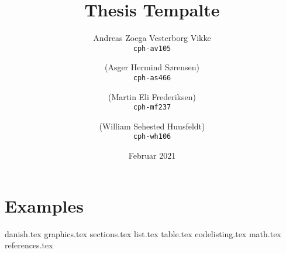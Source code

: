 \documentclass[a4paper,12pt]{report}
\title{Thesis Tempalte}
\author{
    Andreas Zoega Vesterborg Vikke\\
    \texttt{cph-av105}
    \and
    (Asger Hermind Sørensen)\\
    \texttt{cph-as466}
    \and
    (Martin Eli Frederiksen)\\
    \texttt{cph-mf237}
    \and
    (William Sehested Huusfeldt)\\
    \texttt{cph-wh106}
}
\date{Februar 2021}
\begin{document}
\listoftodos
{}

\maketitle
\tableofcontents

\chapter{Examples}
{danish.tex}
{graphics.tex}
{sections.tex}
{list.tex}
{table.tex}
{codelisting.tex}
{math.tex}
{references.tex}



\end{document}

